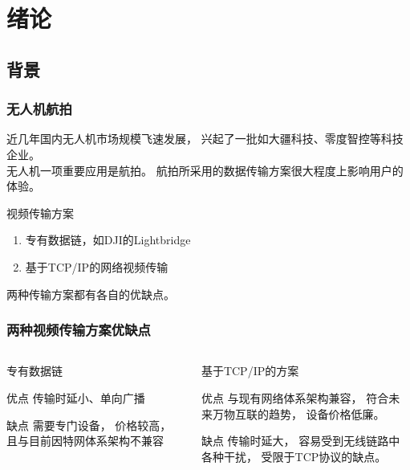 \section{绪论}

\subsection{背景}
\begin{frame}
	\frametitle{无人机航拍}
	近几年国内无人机市场规模飞速发展，
	兴起了一批如大疆科技、零度智控等科技企业。
	\\
	无人机一项重要应用是航拍。
	航拍所采用的数据传输方案很大程度上影响用户的体验。
	\vspace{1em}
	\begin{block}{视频传输方案}
		\footnotesize
		\begin{enumerate}[(1)]
			\item 专有数据链，如DJI的Lightbridge
			\item 基于TCP/IP的网络视频传输
		\end{enumerate}
	\end{block}
	\vspace{1.5em}
	两种传输方案都有各自的优缺点。
\end{frame}
\begin{frame}
	\frametitle{两种视频传输方案优缺点}
	\begin{columns}[t]
		
		\begin{column}{0.4\textwidth}
			\begin{block}{专有数据链}
				\footnotesize
				\begin{block}{优点}
				传输时延小、单向广播
				\end{block}
				\begin{block}{缺点}
				需要专门设备，
				价格较高，
				且与目前因特网体系架构不兼容
				\end{block}
			\end{block}
		\end{column}
		\begin{column}{0.55\textwidth}
			\begin{block}{基于TCP/IP的方案}
				\footnotesize
				\begin{block}{优点}
				与现有网络体系架构兼容，
				符合未来万物互联的趋势，
				设备价格低廉。
				\end{block}
				\begin{block}{缺点}
				传输时延大，
				容易受到无线链路中各种干扰，
				受限于TCP协议的缺点。
				\end{block}
			\end{block}
		\end{column}
	\end{columns}
\end{frame}
